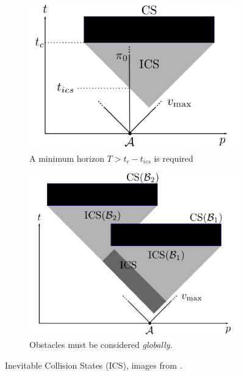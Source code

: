 \begin{figure}[ht]
	\begin{subfigure}[b]{0.48\linewidth}
		\includegraphics[width=\linewidth]{img/ics}
		\caption{A minimum horizon $T > t_c - t_{ics}$ is required}
		\label{fig:ics-1}
	\end{subfigure}
	\begin{subfigure}[b]{0.48\linewidth}
		\includegraphics[width=\linewidth]{img/ics-global}
		\caption{Obstacles must be considered \emph{globally}.}
		\label{fig:ics-2}
	\end{subfigure}
	\caption{Inevitable Collision States (ICS), images from \citep{Fraichard2014}.}
	\label{fig:ics}
\end{figure}

